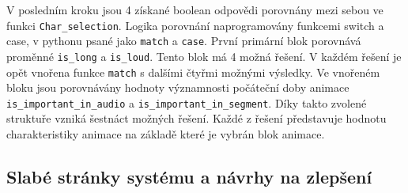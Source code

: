 V posledním kroku jsou 4 získané boolean odpovědi porovnány mezi sebou ve funkci \texttt{Char\_selection}. Logika porovnání naprogramovány funkcemi switch a case, v pythonu psané jako \texttt{match} a \texttt{case}. První primární blok porovnává proměnné \texttt{is\_long} a \texttt{is\_loud}. Tento blok má 4 možná řešení. V každém řešení je opět vnořena funkce \texttt{match} s dalšími čtyřmi možnými výsledky. Ve vnořeném bloku jsou porovnávány hodnoty významnosti počáteční doby animace \texttt{is\_important\_in\_audio} a \texttt{is\_important\_in\_segment}. Díky takto zvolené struktuře vzniká šestnáct možných řešení. Každé z řešení představuje hodnotu charakteristiky animace na základě které je vybrán blok animace. 

\subsection{Slabé stránky systému a návrhy na zlepšení}





